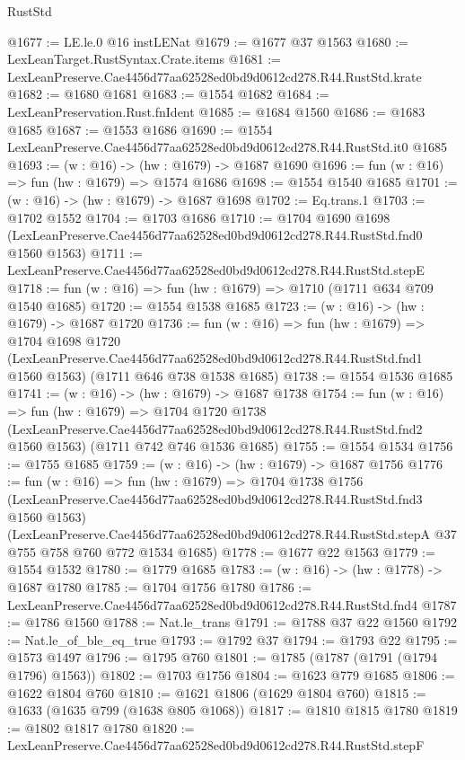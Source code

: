 \begin{lexlean}{RustStd}
\begin{coremodule}
@1677 := LE.le.{0} @16 instLENat
@1679 := @1677 @37 @1563
@1680 := LexLeanTarget.RustSyntax.Crate.items
@1681 := LexLeanPreserve.Cae4456d77aa62528ed0bd9d0612cd278.R44.RustStd.krate
@1682 := @1680 @1681
@1683 := @1554 @1682
@1684 := LexLeanPreservation.Rust.fnIdent
@1685 := @1684 @1560
@1686 := @1683 @1685
@1687 := @1553 @1686
@1690 := @1554 LexLeanPreserve.Cae4456d77aa62528ed0bd9d0612cd278.R44.RustStd.it0 @1685
@1693 := (w : @16) -> (hw : @1679) -> @1687 @1690
@1696 := fun (w : @16) => fun (hw : @1679) => @1574 @1686
@1698 := @1554 @1540 @1685
@1701 := (w : @16) -> (hw : @1679) -> @1687 @1698
@1702 := Eq.trans.{1}
@1703 := @1702 @1552
@1704 := @1703 @1686
@1710 := @1704
    @1690
    @1698
    (LexLeanPreserve.Cae4456d77aa62528ed0bd9d0612cd278.R44.RustStd.fnd0 @1560 @1563)
@1711 := LexLeanPreserve.Cae4456d77aa62528ed0bd9d0612cd278.R44.RustStd.stepE
@1718 := fun (w : @16) => fun (hw : @1679) => @1710 (@1711 @634 @709 @1540 @1685)
@1720 := @1554 @1538 @1685
@1723 := (w : @16) -> (hw : @1679) -> @1687 @1720
@1736 := fun (w : @16) =>
  fun (hw : @1679) =>
  @1704
    @1698
    @1720
    (LexLeanPreserve.Cae4456d77aa62528ed0bd9d0612cd278.R44.RustStd.fnd1 @1560 @1563)
    (@1711 @646 @738 @1538 @1685)
@1738 := @1554 @1536 @1685
@1741 := (w : @16) -> (hw : @1679) -> @1687 @1738
@1754 := fun (w : @16) =>
  fun (hw : @1679) =>
  @1704
    @1720
    @1738
    (LexLeanPreserve.Cae4456d77aa62528ed0bd9d0612cd278.R44.RustStd.fnd2 @1560 @1563)
    (@1711 @742 @746 @1536 @1685)
@1755 := @1554 @1534
@1756 := @1755 @1685
@1759 := (w : @16) -> (hw : @1679) -> @1687 @1756
@1776 := fun (w : @16) =>
  fun (hw : @1679) =>
  @1704
    @1738
    @1756
    (LexLeanPreserve.Cae4456d77aa62528ed0bd9d0612cd278.R44.RustStd.fnd3 @1560 @1563)
    (LexLeanPreserve.Cae4456d77aa62528ed0bd9d0612cd278.R44.RustStd.stepA
      @37
      @755
      @758
      @760
      @772
      @1534
      @1685)
@1778 := @1677 @22 @1563
@1779 := @1554 @1532
@1780 := @1779 @1685
@1783 := (w : @16) -> (hw : @1778) -> @1687 @1780
@1785 := @1704 @1756 @1780
@1786 := LexLeanPreserve.Cae4456d77aa62528ed0bd9d0612cd278.R44.RustStd.fnd4
@1787 := @1786 @1560
@1788 := Nat.le_trans
@1791 := @1788 @37 @22 @1560
@1792 := Nat.le_of_ble_eq_true
@1793 := @1792 @37
@1794 := @1793 @22
@1795 := @1573 @1497
@1796 := @1795 @760
@1801 := @1785 (@1787 (@1791 (@1794 @1796) @1563))
@1802 := @1703 @1756
@1804 := @1623 @779 @1685
@1806 := @1622 @1804 @760
@1810 := @1621 @1806 (@1629 @1804 @760)
@1815 := @1633 (@1635 @799 (@1638 @805 @1068))
@1817 := @1810 @1815 @1780
@1819 := @1802 @1817 @1780
@1820 := LexLeanPreserve.Cae4456d77aa62528ed0bd9d0612cd278.R44.RustStd.stepF

\end{coremodule}
\end{lexlean}
